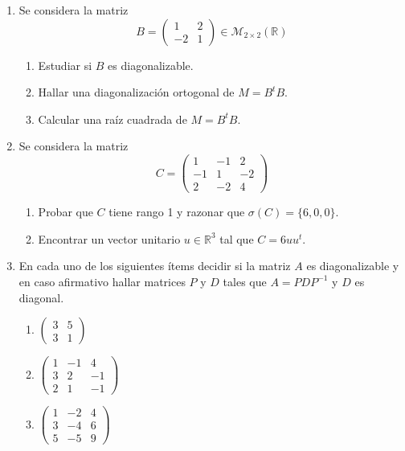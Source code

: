\documentclass[12pt,letterpaper]{article}
\begin{document}
\begin{enumerate}
\begin{enumerate}
  \end{enumerate}
  \item Se considera la matriz
  $$
  B=\begin{pmatrix}
  1 & 2\\
  -2 & 1
  \end{pmatrix} \in \mathcal{M}_{2\times2}(\mathbb{R}) 
  $$
  \begin{enumerate}
    \item Estudiar si $B$ es diagonalizable.
    \item Hallar una diagonalización ortogonal de $M = B^tB$.
    \item Calcular una raíz cuadrada de $M = B^tB$.
  \end{enumerate}
  \item Se considera la matriz
  $$
  C=\begin{pmatrix}
  1 & -1 & 2\\
  -1 & 1 & -2\\
  2 & -2 & 4
  \end{pmatrix}
  $$
  \begin{enumerate}
    \item Probar que $C$ tiene rango 1 y razonar que $\sigma(C) = \{6, 0, 0\}$.
    \item Encontrar un vector unitario $u \in \mathbb{R}^3$ tal que $C= 6uu^t$.  
  \end{enumerate}
  \item En cada uno de los siguientes ítems decidir si la matriz $A$ es diagonalizable y en caso afirmativo hallar matrices $P$ y $D$ tales que $A = PDP^{-1}$ y $D$ es diagonal.
  \begin{multicols}{3}
    \begin{enumerate}
    \item $\begin{pmatrix}
      3 & 5\\
      3 & 1
    \end{pmatrix}$
    \item $\begin{pmatrix}
      1 & -1 & 4\\
      3 & 2 & -1\\
      2 & 1 & -1 
    \end{pmatrix}$
    \item $\begin{pmatrix}
      1 & -2 & 4\\
      3 & -4 & 6\\
      5 & -5 & 9 
    \end{pmatrix}$

\end{enumerate}
\end{multicols}
\end{enumerate}
\end{document}
